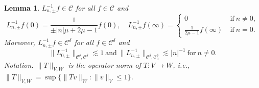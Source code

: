 \documentclass[10pt,a4paper]{amsart}
\newtheorem{lemma}{Lemma}
\newcommand{\mcal}{\mathcal}
\newcommand{\norm}[1]{\lVert #1 \rVert}
\begin{document}
\begin{lemma} \label{lem:3.6}
$L_{n,\pm}^{-1} f\in \mcal{C}$ for all $f\in\mcal{C}$ and
\begin{equation} \label{eq:3.6}
L_{n,\pm}^{-1} f(0) = \frac{1}{\pm |n|\mu + 2\mu - 1} f(0), \quad L_{n,\pm}^{-1} f(\infty) = \begin{cases} 0 & ~\text{if}~ n \neq 0, \\ \frac{1}{2\mu - 1} f(\infty) &~\text{if}~n=0. \end{cases}
\end{equation}
Moreover, $L_{n,\pm}^{-1} f \in \mcal{C}^\delta$ for all $f\in \mcal{C}^\delta$ and
\begin{equation} \label{eq:3.7}
\norm{L_{0,\pm}^{-1}}_{\mcal{C}^\delta, \mcal{C}^\delta} \lesssim 1 ~\text{and}~ \norm{L_{n,\pm}^{-1}}_{\mcal{C}^\delta,\mcal{C}^\delta_0} \lesssim |n|^{-1} ~\text{for}~n\neq 0.
\end{equation}
\textit{Notation}. $\norm{T}_{V,W}$ is the operator norm of $T:V\to W$, i.e., $\norm{T}_{V,W} = \sup \{\norm{Tv}_{W} : \norm{v}_V\leq 1\}$.
\end{lemma}
\end{document}

